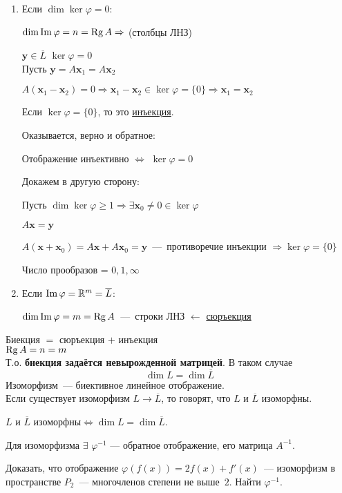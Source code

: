 \begin{enumerate}
	\item Если \underline{$\dim\ker\varphi=0$}:
	
	$\dim \operatorname{\mathop{Im}} \varphi = n = \operatorname{\mathop{Rg}} A \Rightarrow$ (столбцы ЛНЗ)
	
	$\textbf{y} \in \overline{L}$
	$\ker\varphi = {0}$\\
	Пусть $\textbf{y}=A\textbf{x$_1$}=A\textbf{x$_2$}$
	
	$A(\textbf{x$_1$}-\textbf{x$_2$}) = 0 \Rightarrow \textbf{x$_1$} - \textbf{x$_2$} \in \ker\varphi =\{0\} \Rightarrow \textbf{x$_1$}=\textbf{x$_2$}$
	
	Если $\ker\varphi = \{0\}$, то это \underline{инъекция}.
	
	Оказывается, верно и обратное:
	
	Отображение инъективно $\Leftrightarrow$ $\ker\varphi = {0}$
	
	Докажем в другую сторону:
	
	Пусть $\dim\ker \varphi \geq 1  \Rightarrow \exists \textbf{x$_0$} \neq 0 \in \ker \varphi$
	
	$A\textbf{x}=\textbf{y}$
	
	$A(\textbf{x}+\textbf{x$_0$}) = A\textbf{x}+A\textbf{x$_0$} = \textbf{y}$~---~противоречие инъекции $\Rightarrow \ker\varphi = \{0\}$
	
	Число прообразов = $0, 1, \infty$
	\item Если \underline{$\operatorname{\mathop{Im}}\varphi = \mathbb{R}^m = \overline{L}$}:
	
	$\dim \operatorname{\mathop{Im}}\varphi = m = \operatorname{\mathop{Rg}} A$~---~строки ЛНЗ $\leftarrow$ \underline{сюръекция}
\end{enumerate}
Биекция $=$ сюръекция $+$ инъекция\\
$\operatorname{\mathop{Rg}} A=n=m$\\
Т.о. \textbf{биекция задаётся невырожденной матрицей}. В таком случае
$$\dim L = \dim \overline L$$
\textsf{Изоморфизм}~--- биективное линейное отображение.\\
Если существует изоморфизм $L \to \overline L$, то говорят, что $L$ и $\overline L$ \textsf{изоморфны}.

\begin{theorem}
	$L$ и $\overline L$ изоморфны$\iff \dim L =
	\dim \overline L$.
\end{theorem}

Для изоморфизма $\exists$ $\varphi^{-1}$ --- \textsf{обратное отображение}, его матрица $A^{-1}$.

\begin{prim}
	Доказать, что отображение $\varphi(f(x)) = 2f(x) + f'(x)$~--- изоморфизм
	в пространстве $P_2$~---  многочленов степени не выше~$2$. Найти $\varphi^{-1}$.
\end{prim}\\

